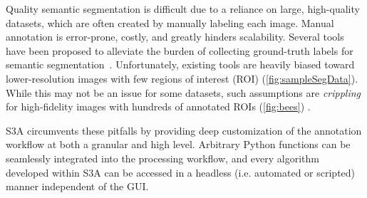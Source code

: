 Quality semantic segmentation is difficult due to a reliance on large, high-quality datasets, which are often created by manually labeling each image.
Manual annotation is error-prone, costly, and greatly hinders scalability.
Several tools have been proposed to alleviate the burden of collecting ground-truth labels for semantic segmentation~\cite{BestImageAnnotation}.
Unfortunately, existing tools are heavily biased toward lower-resolution images with few regions of interest (ROI) (\autoref{fig:sampleSegData}).
While this may not be an issue for some datasets, such assumptions are \emph{crippling} for high-fidelity images with hundreds of annotated ROIs (\autoref{fig:bees}) \cite{Ladicky_whatWhereCombiningCRFs,Wang_multiLabelImageAnnotation}.

\makeSampleSegFig
\makeBeesFig


S3A circumvents these pitfalls by providing deep customization of the annotation workflow at both a granular and high level.
Arbitrary Python functions can be seamlessly integrated into the processing workflow, and every algorithm developed within S3A can be accessed in a headless (i.e. automated or scripted) manner independent of the GUI.

